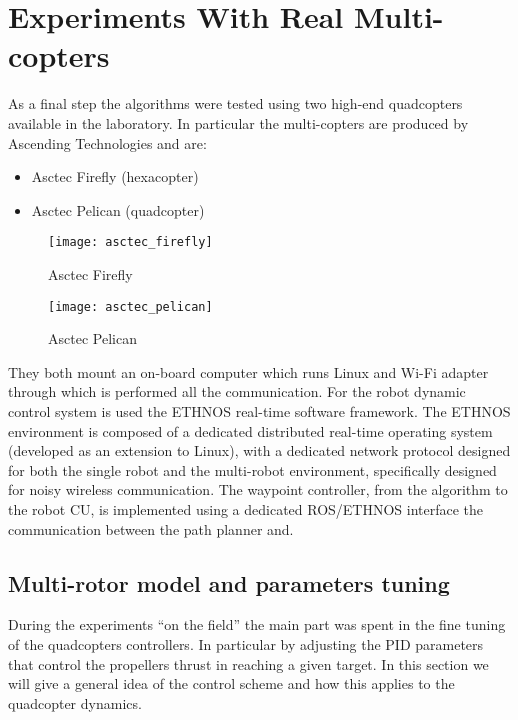 \chapter{Experiments With Real Multi-copters}

As a final step the algorithms were tested using two high-end quadcopters available in the laboratory. In particular the multi-copters are produced by Ascending Technologies and are:
\begin{itemize}
\item Asctec Firefly (hexacopter)
\item Asctec Pelican (quadcopter)
\end{itemize}

\begin{figure}[H] 
  \begin{minipage}[b]{0.5\linewidth}
    \centering
    \texttt{[image: asctec\_firefly]}
    \caption{Asctec Firefly}
    \label{fig:firefly}
    \vspace{4ex}
  \end{minipage}
  \begin{minipage}[b]{0.5\linewidth}
    \centering
    \texttt{[image: asctec\_pelican]}
    \caption{Asctec Pelican}
    \label{fig:pelican}
    \vspace{4ex}%
  \end{minipage}
\end{figure}


They both mount an on-board computer which runs Linux and Wi-Fi adapter through which is performed all the communication. For the robot dynamic control system is used the ETHNOS \cite{ethnos2000} real-time software framework. The ETHNOS environment is composed of a dedicated distributed real-time operating system (developed as an extension to Linux), with a dedicated network protocol designed for both the single robot and the multi-robot environment, specifically designed for noisy wireless communication. The waypoint controller, from the algorithm to the robot CU, is implemented using a dedicated ROS/ETHNOS interface the communication between the path planner and.


\section{Multi-rotor model and parameters tuning}


During the experiments ``on the field'' the main part was spent in the fine tuning of the quadcopters controllers. In particular by adjusting the PID parameters that control the propellers thrust in reaching a given target. In this section we will give a general idea of the control scheme and how this applies to the quadcopter dynamics.

